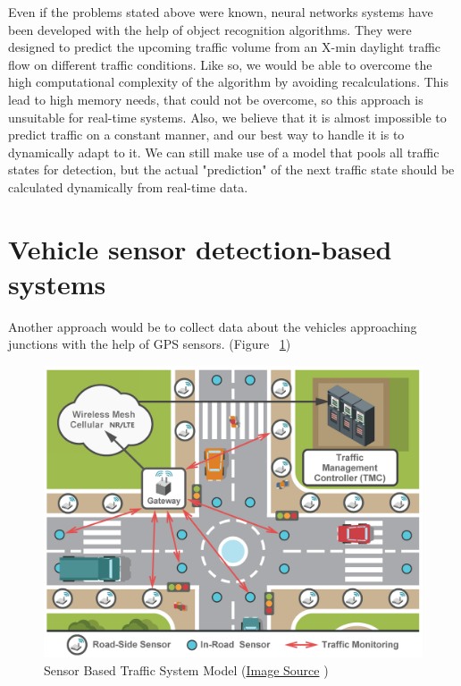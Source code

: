 \documentclass[17pt]{report}
\begin{document}
\indent \indent
Even if the problems stated above were known,
neural networks systems have been developed with the help of
object recognition algorithms.
They were designed to predict the upcoming traffic volume
from an X-min daylight traffic flow on different traffic conditions. 
Like so, we would be able to overcome the high computational
complexity of the algorithm by avoiding 
recalculations. This lead to high memory needs,
that could not be overcome, so this approach is
unsuitable for real-time systems. Also, we believe that it 
is almost impossible to predict traffic on a constant manner, 
and our best way to handle it is to dynamically adapt to it.
We can still make use of a model that pools all traffic states 
for detection, but the actual "prediction" of the next traffic 
state should be calculated dynamically from real-time data.\\

\section{Vehicle sensor detection-based systems}
\indent \indent
Another approach would be to collect data about the vehicles 
approaching junctions with the help of GPS sensors.
(Figure ~\ref{fig:SensorRecognitionSystem})
\begin{figure}[h!]
    \includegraphics[width=\textwidth]{SensorsBasedTrafficControlSystemRepresentation.png}
    \caption{Sensor Based Traffic System Model 
    (\href{https://www.researchgate.net/figure/Communications-chain-of-data-feeds-in-smart-transportation_fig3_309740417}{Image Source} \textcopyright)}
    \label{fig:SensorRecognitionSystem}
\end{figure}
\end{document}
